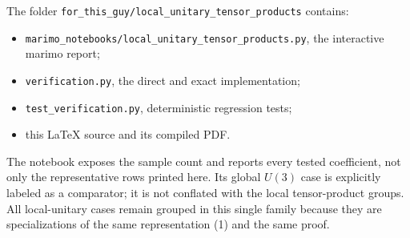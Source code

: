 \documentclass[11pt]{article}
\begin{document}
The folder \texttt{for\_this\_guy/local\_unitary\_tensor\_products} contains:
\begin{itemize}[leftmargin=1.5em]
 \item \texttt{marimo_notebooks/local_unitary_tensor_products.py}, the interactive marimo report;
 \item \texttt{verification.py}, the direct and exact implementation;
 \item \texttt{test\_verification.py}, deterministic regression tests;
 \item this \LaTeX{} source and its compiled PDF.
\end{itemize}
The notebook exposes the sample count and reports every tested coefficient, not
only the representative rows printed here. Its global $U(3)$ case is explicitly
labeled as a comparator; it is not conflated with the local tensor-product
groups. All local-unitary cases remain grouped in this single family because
they are specializations of the same representation (1) and the same proof.
\end{document}
